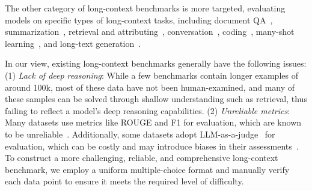 The other category of long-context benchmarks is more targeted, evaluating models on specific types of long-context tasks, including document QA~\cite{kovcisky2018narrativeqa,dua2019drop,dasigi2021dataset,pang2022quality,wang2024leave}, summarization~\cite{zhong2021qmsum,huang2021efficient,wang2022squality}, retrieval and attributing~\cite{needleinhaystack,kuratov2024babilong,song2024counting,laban2024summary,zhang2024longcite,vodrahalli2024michelangelo,krishna2024fact}, conversation~\cite{bai2024longalign}, coding~\cite{liu2023repobench,bogomolov2024long}, many-shot learning~\cite{agarwal2024many}, and long-text generation~\cite{bai2024longwriter,wu2024longgenbench,liu2024longgenbench,que2024hellobench}.

In our view, existing long-context benchmarks generally have the following issues: (1) \emph{Lack of deep reasoning}: While a few benchmarks contain longer examples of around 100k, most of these data have not been human-examined, and many of these samples can be solved through shallow understanding such as retrieval, thus failing to reflect a model's deep reasoning capabilities.
(2) \emph{Unreliable metrics}: Many datasets use metrics like ROUGE and F1 for evaluation, which are known to be unreliable~\cite{novikova2017we}. Additionally, some datasets adopt LLM-as-a-judge~\cite{zheng2023judging,li2024generation} for evaluation, which can be costly and may introduce biases in their assessments~\cite{bai2024benchmarking,ye2024justice}.
To construct a more challenging, reliable, and comprehensive long-context benchmark, we employ a uniform multiple-choice format and manually verify each data point to ensure it meets the required level of difficulty.
